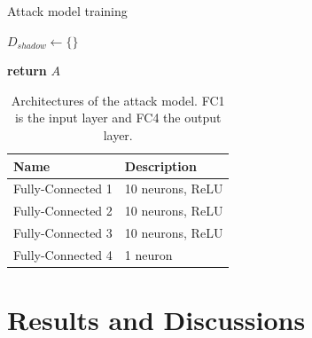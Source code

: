 \documentclass[11pt]{article}
\begin{document}
\begin{algorithm}
\caption{Attack model training}\label{attack_algo}
\begin{algorithmic}[1]
\State $D_{shadow}\gets \{\}$
\EndFor


\State \textbf{return} $A$
\EndProcedure
\end{algorithmic}
\end{algorithm}

\begin{table}[h!]
\centering
\begin{tabular}{@{}ll@{}}
\toprule
Name              & Description       \\ \midrule
Fully-Connected 1 & 10 neurons, ReLU  \\
Fully-Connected 2 & 10 neurons, ReLU  \\
Fully-Connected 3 & 10 neurons, ReLU  \\
Fully-Connected 4 & 1 neuron          \\ \bottomrule
\end{tabular}
\caption{Architectures of the attack model. FC1 is the input layer and FC4 the output layer.}
\label{attack_architecture}
\end{table}

\section{Results and Discussions}
\end{document}
